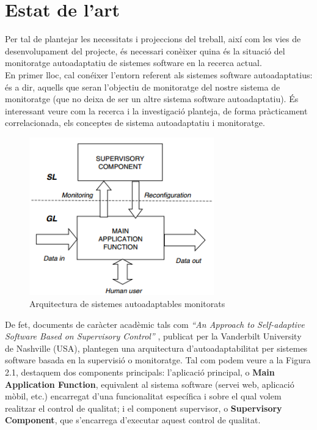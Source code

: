 
\section{Estat de l'art}

Per tal de plantejar les necessitats i projeccions del treball, així com les vies de desenvolupament del projecte, és necessari conèixer quina és la situació del monitoratge autoadaptatiu de sistemes software en la recerca actual.\\

En primer lloc, cal conéixer l’entorn referent als sistemes software autoadaptatius: és a dir, aquells que seran l’objectiu de monitoratge del nostre sistema de monitoratge (que no deixa de ser un altre sistema software autoadaptatiu). És interessant veure com la recerca i la investigació planteja, de forma pràcticament correlacionada, els conceptes de sistema autoadaptatiu i monitoratge.\\

\begin{figure}
\centering
\includegraphics[width=8cm]{Figures/Figure1}
\decoRule
\caption[Arquitectura de sistemes auotadaptables monitorats]{Arquitectura de sistemes autoadaptables monitorats}
\label{fig:Figura1}
\end{figure}

De fet, documents de caràcter acadèmic tals com \textit{“An Approach to Self-adaptive Software Based on Supervisory Control”} , publicat per la Vanderbilt University de Nashville (USA), plantegen una arquitectura d’autoadaptabilitat per sistemes software basada en la supervisió o monitoratge. Tal com podem veure a la Figura 2.1, destaquem dos components principals: l’aplicació principal, o \textbf{Main Application Function}, equivalent al sistema software (servei web, aplicació mòbil, etc.) encarregat d'una funcionalitat específica i sobre el qual volem realitzar el control de qualitat; i el component supervisor, o \textbf{Supervisory Component}, que s'encarrega d'executar aquest control de qualitat.\\

